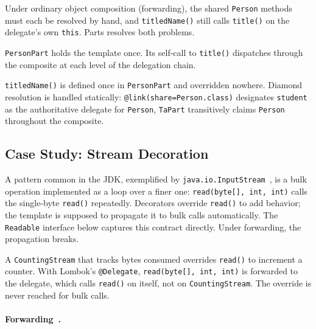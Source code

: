 \documentclass[sigplan,10pt,review,anonymous]{acmart}
\theoremstyle{acmplain}
\newcommand{\code}[1]{\texttt{#1}}
\begin{document}
Under ordinary object composition (forwarding), the shared \code{Person} methods
must each be resolved by hand, and \code{titledName()} still calls
\code{title()} on the delegate's own \code{this}. Parts resolves both problems.

\code{PersonPart} holds the template once. Its self-call to \code{title()}
dispatches through the composite at each level of the delegation chain.

\code{titledName()} is defined once in \code{PersonPart} and overridden
nowhere. Diamond resolution is handled statically: \code{@link(share=Person.class)}
designates \code{student} as the authoritative delegate for \code{Person}, \code{TaPart}
transitively claims \code{Person} throughout the composite.

\subsection{Case Study: Stream Decoration}

A pattern common in the JDK, exemplified by \code{java.io.InputStream}~\cite{gamma1994}, is
a bulk operation implemented as a loop over a finer one: \code{read(byte[],
int, int)} calls the single-byte \code{read()} repeatedly. Decorators override
\code{read()} to add behavior; the template is supposed to propagate it to bulk
calls automatically. The \code{Readable} interface below captures this contract
directly. Under forwarding, the propagation breaks.

A \code{CountingStream} that tracks bytes consumed overrides \code{read()} to
increment a counter. With Lombok's \code{@Delegate}, \code{read(byte[], int, int)} is
forwarded to the delegate, which calls \code{read()} on itself, not on
\code{CountingStream}. The override is never reached for bulk calls.

\paragraph{Forwarding~\cite{lombok}.}\leavevmode
\end{document}
